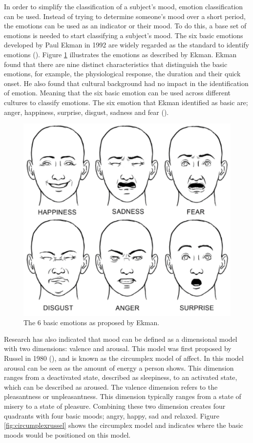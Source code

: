 In order to simplify the classification of a subject's mood, emotion classification can be used. Instead of trying to determine someone's mood over a short period, the emotions can be used as an indicator or their mood. To do this, a base set of emotions is needed to start classifying a subject's mood. The six basic emotions developed by Paul Ekman in 1992 are widely regarded as the standard to identify emotions (\cite{ekman1992argument}). Figure \ref{fig:basicemotion} illustrates the emotions as described by Ekman. Ekman found that there are nine distinct characteristics that distinguish the basic emotions, for example, the physiological response, the duration and their quick onset. He also found that cultural background had no impact in the identification of emotion. Meaning that the six basic emotion can be used across different cultures to classify emotions. The six emotion that Ekman identified as basic are; anger, happiness, surprise, disgust, sadness and fear (\cite{ekman1992argument}). 

\begin{figure}[h]
  \centering
  \includegraphics[width=\columnwidth]{Images/ekman_six_emotion.png}
  \caption{The 6 basic emotions as proposed by Ekman.}
  \label{fig:basicemotion}
\end{figure}

Research has also indicated that mood can be defined as a dimensional model with two dimensions: valence and arousal. This model was first proposed by Russel in 1980 (\cite{russell1980circumplex}), and is known as the circumplex model of affect. In this model arousal can be seen as the amount of energy a person shows. This dimension ranges from a deactivated state, described as sleepiness, to an activated state, which can be described as aroused. The valence dimension refers to the pleasantness or unpleasantness. This dimension typically ranges from a state of misery to a state of pleasure. Combining these two dimension creates four quadrants with four basic moods; angry, happy, sad and relaxed. Figure \ref{fig:circumplexrussel} shows the circumplex model and indicates where the basic moods would be positioned on this model.

